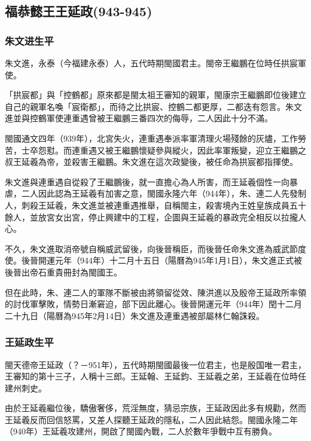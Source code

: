 
\subsection{福恭懿王王延政\tiny(943-945)}

\subsubsection{朱文进生平}

朱文進，永泰（今福建永泰）人，五代時期閩國君主。閩帝王繼鵬在位時任拱宸軍使。

「拱宸都」與「控鶴都」原來都是閩太祖王審知的親軍，閩康宗王繼鵬即位後建立自己的親軍名喚「宸衛都」，而待之比拱宸、控鶴二都更厚，二都迭有怨言。朱文進並與控鶴軍使連重遇曾被王繼鵬三番四次的侮辱，二人因此十分不滿。

閩國通文四年（939年），北宮失火，連重遇奉派率軍清理火場殘餘的灰燼，工作勞苦，士卒怨懟。而連重遇又被王繼鵬懷疑參與縱火，因此率軍叛變，迎立王繼鵬之叔王延羲為帝，並殺害王繼鵬。朱文進在這次政變後，被任命為拱宸都指揮使。

朱文進與連重遇自從殺了王繼鵬後，就一直擔心為人所害，而王延羲個性一向暴虐，二人因此認為王延羲有加害之意，閩國永隆六年（944年），朱、連二人先發制人，刺殺王延羲，朱文進並被連重遇推舉，自稱閩主，殺害境內王姓皇族成員五十餘人，並放宮女出宮，停止興建中的工程，企圖與王延羲的暴政完全相反以拉攏人心。

不久，朱文進取消帝號自稱威武留後，向後晉稱臣，而後晉任命朱文進為威武節度使。後晉開運元年（944年）十二月十五日（陽曆為945年1月1日），朱文進正式被後晉出帝石重貴冊封為閩國王。

但在此時，朱、連二人的軍隊不斷被由將領留從效、陳洪進以及殷帝王延政所率領的討伐軍擊敗，情勢日漸窘迫，部下因此離心。後晉開運元年（944年）閏十二月二十九日（陽曆為945年2月14日）朱文進及連重遇被部屬林仁翰誅殺。

\subsubsection{王延政生平}

閩天德帝王延政（？－951年），五代時期閩國最後一位君主，也是殷国唯一君主，王審知的第十三子，人稱十三郎。王延翰、王延鈞、王延羲之弟，王延羲在位時任建州刺史。

由於王延羲繼位後，驕傲奢侈，荒淫無度，猜忌宗族，王延政因此多有規勸，然而王延羲反而回信怒罵，又差人探聽王延政的隱私，二人因此結怨。閩國永隆二年（940年）王延羲攻建州，開啟了閩國內戰，二人於數年爭戰中互有勝負。

